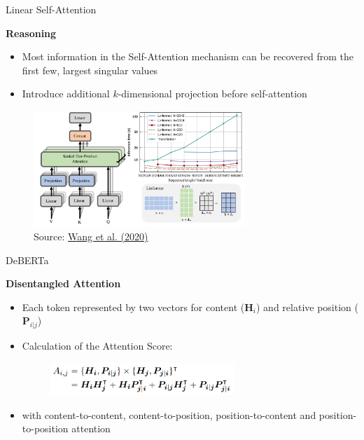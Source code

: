 \begin{frame}{Linear Self-Attention}

\vfill

\textbf{Reasoning \href{https://arxiv.org/pdf/2006.04768.pdf}{}} 

\begin{itemize}
	\item Most information in the Self-Attention mechanism can be recovered from the first few, largest singular values
	\item Introduce additional $k$-dimensional projection before self-attention
\end{itemize}

	\begin{figure}
		\centering
		\includegraphics[width = 8cm]{figure/linformer.png}\\ 
		{\footnotesize Source: \href{https://arxiv.org/pdf/2006.04768.pdf}{Wang et al. (2020)}}
	\end{figure}
	
\vfill

\end{frame}


\begin{frame}{DeBERTa}

\vfill

	\textbf{Disentangled Attention \href{https://arxiv.org/pdf/2006.03654.pdf}{}}
	\begin{itemize}
		\item Each token represented by two vectors for content ($\mathbf{H}_i$) and relative position ($\mathbf{P}_{i|j}$) 
		\item Calculation of the Attention Score:
	\begin{figure}
		\centering
		\includegraphics[width = 7cm]{figure/deberta-attn.png}
	\end{figure}
		\item with content-to-content, content-to-position, position-to-content and position-to-position attention
	\end{itemize}
	
\vfill

\end{frame}

